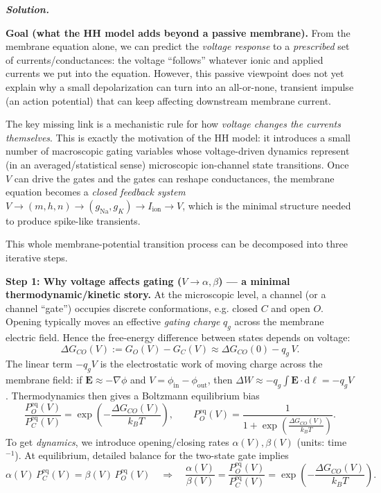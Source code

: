 \documentclass{article}
\newif\ifsolutionclearpage
\newcommand{\nosolutionpagebreak}{\global\solutionclearpagefalse}
\newenvironment{solution}{%
    \ifsolutionclearpage\clearpage\fi
    \global\solutionclearpagetrue
    \par\noindent\begin{solutionbox}\textbf{\textit{Solution.}}\par\medskip\itshape
}{%
    \end{solutionbox}
}
\renewenvironment{equation}{\begin{equation*}}{\end{equation*}}
\begin{document}
\nosolutionpagebreak
\begin{solution}
\textbf{Goal (what the HH model adds beyond a passive membrane).}
From the membrane equation alone, we can predict the \emph{voltage response} to a \emph{prescribed} set of currents/conductances: the voltage ``follows'' whatever ionic and applied currents we put into the equation.
However, this passive viewpoint does not yet explain why a small depolarization can turn into an all-or-none, transient impulse (an action potential) that can keep affecting downstream membrane current.

The key missing link is a mechanistic rule for how \emph{voltage changes the currents themselves}.
This is exactly the motivation of the HH model: it introduces a small number of macroscopic gating variables whose voltage-driven dynamics represent (in an averaged/statistical sense) microscopic ion-channel state transitions.
Once $V$ can drive the gates and the gates can reshape conductances, the membrane equation becomes a \emph{closed feedback system} $V\to (m,h,n)\to (g_{\mathrm{Na}},g_K)\to I_{\text{ion}}\to V$, which is the minimal structure needed to produce spike-like transients.

\tcbbreak

This whole membrane-potential transition process can be decomposed into three iterative steps.

\medskip
\textbf{Step 1: Why voltage affects gating ($V\to \alpha,\beta$) --- a minimal thermodynamic/kinetic story.}
At the microscopic level, a channel (or a channel ``gate'') occupies discrete conformations, e.g. closed $C$ and open $O$.
Opening typically moves an effective \emph{gating charge} $q_g$ across the membrane electric field.
Hence the free-energy difference between states depends on voltage:
\begin{equation}
\Delta G_{CO}(V) := G_O(V)-G_C(V) \approx \Delta G_{CO}(0) - q_g\,V.
\end{equation}
The linear term $-q_gV$ is the electrostatic work of moving charge across the membrane field: if $\mathbf E\approx -\nabla \phi$ and $V=\phi_{\text{in}}-\phi_{\text{out}}$, then $\Delta W\approx -q_g\!\int \mathbf E\cdot \mathrm d\boldsymbol\ell = -q_g V$.
Thermodynamics then gives a Boltzmann equilibrium bias
\begin{equation}
\frac{P_O^{\mathrm{eq}}(V)}{P_C^{\mathrm{eq}}(V)} = \exp\!\left(-\frac{\Delta G_{CO}(V)}{k_B T}\right),
\qquad
P_O^{\mathrm{eq}}(V)=\frac{1}{1+\exp\!\left(\frac{\Delta G_{CO}(V)}{k_B T}\right)}.
\end{equation}
To get \emph{dynamics}, we introduce opening/closing rates $\alpha(V),\beta(V)$ (units: time$^{-1}$).
At equilibrium, detailed balance for the two-state gate implies
\begin{equation}
\alpha(V)\,P_C^{\mathrm{eq}}(V)=\beta(V)\,P_O^{\mathrm{eq}}(V)
\quad\Longrightarrow\quad
\frac{\alpha(V)}{\beta(V)}=\frac{P_O^{\mathrm{eq}}(V)}{P_C^{\mathrm{eq}}(V)}
=\exp\!\left(-\frac{\Delta G_{CO}(V)}{k_B T}\right).
\end{equation}


\end{solution}
\end{document}
